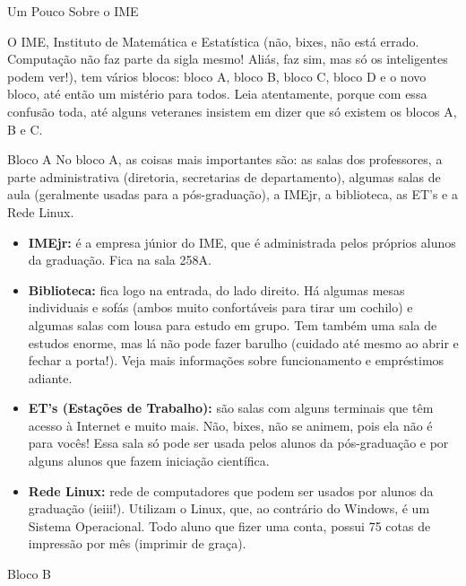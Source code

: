 \begin{secao}{Um Pouco Sobre o IME}
	
O IME, Instituto de Matemática e Estatística (não, bixes, não está errado.
Computação não faz parte da sigla mesmo! Aliás, faz sim, mas só os inteligentes
podem ver!), tem vários blocos: bloco A, bloco B, bloco C, bloco D e o
novo bloco, até então um mistério para todos. Leia atentamente, porque com essa
confusão toda, até alguns veteranes insistem em dizer que só existem os blocos
A, B e C.


\begin{subsecao}{Bloco A}
No bloco A, as coisas mais importantes são: as salas dos professores, a parte
administrativa (diretoria, secretarias de departamento), algumas salas de aula
(geralmente usadas para a pós-graduação), a IMEjr, a biblioteca, as ET's e a Rede Linux.

\begin{itemize}

\item {\bf IMEjr:} é a empresa júnior do IME, que é administrada pelos próprios
alunos da graduação. Fica na sala 258A.

\item {\bf Biblioteca:} fica logo na entrada, do lado direito. Há algumas mesas
individuais e sofás (ambos muito confortáveis para tirar um cochilo) e algumas salas
com lousa para estudo em grupo. Tem também uma sala de estudos enorme, 
mas lá não pode fazer barulho (cuidado até mesmo ao abrir e fechar a porta!).
Veja mais informações sobre funcionamento e empréstimos adiante.

\item {\bf ET's (Estações de Trabalho):} são salas com alguns terminais que têm
acesso à Internet e muito mais. Não, bixes, não se animem, pois ela não é para
vocês! Essa sala só pode ser usada pelos alunos da pós-graduação e por alguns
alunos que fazem iniciação científica.

\item {\bf Rede Linux:} rede de computadores que podem ser usados por alunos
da graduação (ieiii!). Utilizam o Linux, que, ao contrário do Windows, é um
Sistema Operacional. Todo aluno que fizer uma conta, possui 75 cotas de impressão por mês 
(imprimir de graça).

\end{itemize}

\end{subsecao}
\pagebreak
\begin{subsecao}{Bloco B}



\end{subsecao}
\end{secao}

